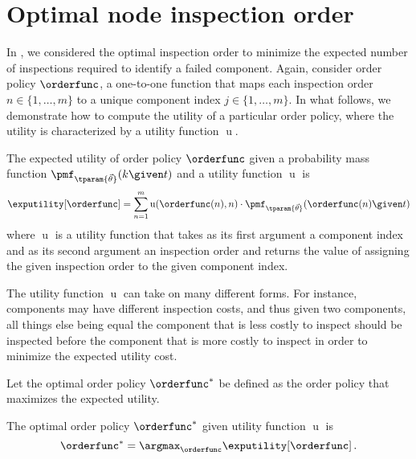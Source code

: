 \chapter{Optimal node inspection order}
In , we considered the optimal inspection order to minimize the expected number of inspections required to identify a failed component. Again, consider order policy $\orderfunc$, a one-to-one function that maps each inspection order $n \in \{1, \ldots, m\}$ to a unique component index $j \in \{1, \ldots, m\}$. In what follows, we demonstrate how to compute the utility of a particular order policy, where the utility is characterized by a utility function $\operatorname{u}$.
\begin{definition}
The expected utility of order policy $\orderfunc$ given a probability mass function $\pmf_{\tparam{\vec\theta}}(k \given t)$ and a utility function $\operatorname{u}$ is
\begin{equation}
\label{eq:expected_utility}
    \exputility[\orderfunc] = \sum_{n=1}^{m} \operatorname{u}(\orderfunc(n), n)
        \cdot \pmf_{\tparam{\vec\theta}}(\orderfunc(n) \given t)
\end{equation}
where $\operatorname{u}$ is a utility function that takes as its first argument a component index and as its second argument an inspection order and returns the value of assigning the given inspection order to the given component index.
\end{definition}
The utility function $\operatorname{u}$ can take on many different forms. For instance, components may have different inspection costs, and thus given two components, all things else being equal the component that is less costly to inspect should be inspected before the component that is more costly to inspect in order to minimize the expected utility cost.

Let the optimal order policy $\orderfunc^{*}$ be defined as the order policy that maximizes the expected utility.
\begin{definition}
The optimal order policy $\orderfunc^{*}$ given utility function $\operatorname{u}$ is
\begin{equation}
    \orderfunc^{*} = \argmax_{\orderfunc} \exputility[\orderfunc]\,.
\end{equation}
\end{definition}

